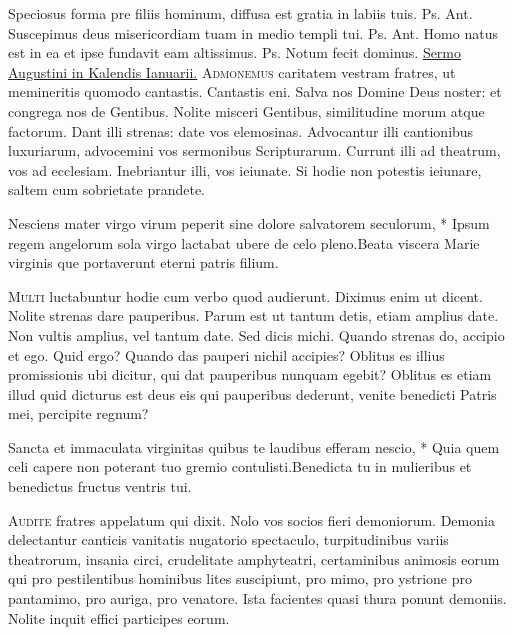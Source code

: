 \begin{multicols*}{2}
\begin{responsory-final}
\end{responsory-final}
 Speciosus forma pre filiis hominum, diffusa est gratia in labiis tuis. {\color{Red} Ps.}  {\color{Red} Ant.} Suscepimus deus misericordiam tuam in medio templi tui. {\color{Red} Ps.}  {\color{Red} Ant.} Homo natus est in ea et ipse fundavit eam altissimus. {\color{Red} Ps.}  \V Notum fecit dominus.
 \ul{Sermo Augustini in Kalendis Ianuarii.} {\color{Red} }
\lettrine[lines=2]{\zallmancaps \color{Blue} A}{dmonemus} caritatem vestram fratres, ut memineritis quomodo cantastis. Cantastis eni. Salva nos Domine Deus noster: et congrega nos de Gentibus. Nolite misceri Gentibus, similitudine morum atque factorum. Dant illi strenas: date vos elemosinas. Advocantur illi cantionibus luxuriarum, advocemini vos sermonibus Scripturarum. Currunt illi ad theatrum, vos ad ecclesiam. Inebriantur illi, vos ieiunate. Si hodie non potestis ieiunare, saltem cum sobrietate prandete.
\begin{responsory}
{Nesciens mater virgo virum peperit sine dolore salvatorem seculorum, * Ipsum regem angelorum sola virgo lactabat ubere de celo pleno.}{Beata viscera Marie virginis que portaverunt eterni patris filium.}
\end{responsory}
\lettrine[lines=2]{\zallmancaps \color{Red} M}{ulti} luctabuntur hodie cum verbo quod audierunt. Diximus enim ut dicent. Nolite strenas dare pauperibus. Parum est ut tantum detis, etiam amplius date. Non vultis amplius, vel tantum date. Sed dicis michi. Quando strenas do, accipio et ego. Quid ergo? Quando das pauperi nichil accipies? Oblitus es illius promissionis ubi dicitur, qui dat pauperibus nunquam egebit? Oblitus es etiam illud quid dicturus est deus eis qui pauperibus dederunt, venite benedicti Patris mei, percipite regnum?
\begin{responsory}
{Sancta et immaculata virginitas quibus te laudibus efferam nescio, * Quia quem celi capere non poterant tuo gremio contulisti.}{Benedicta tu in mulieribus et benedictus fructus ventris tui.}
\end{responsory}
\lettrine[lines=2]{\zallmancaps \color{Blue} A}{udite} fratres appelatum qui dixit. Nolo vos socios fieri demoniorum. Demonia delectantur canticis vanitatis nugatorio spectaculo, turpitudinibus variis theatrorum, insania circi, crudelitate amphyteatri, certaminibus animosis eorum qui pro pestilentibus hominibus lites suscipiunt, pro mimo, pro ystrione pro pantamimo, pro auriga, pro venatore. Ista facientes quasi thura ponunt demoniis. Nolite inquit effici participes eorum.

\end{multicols*}

